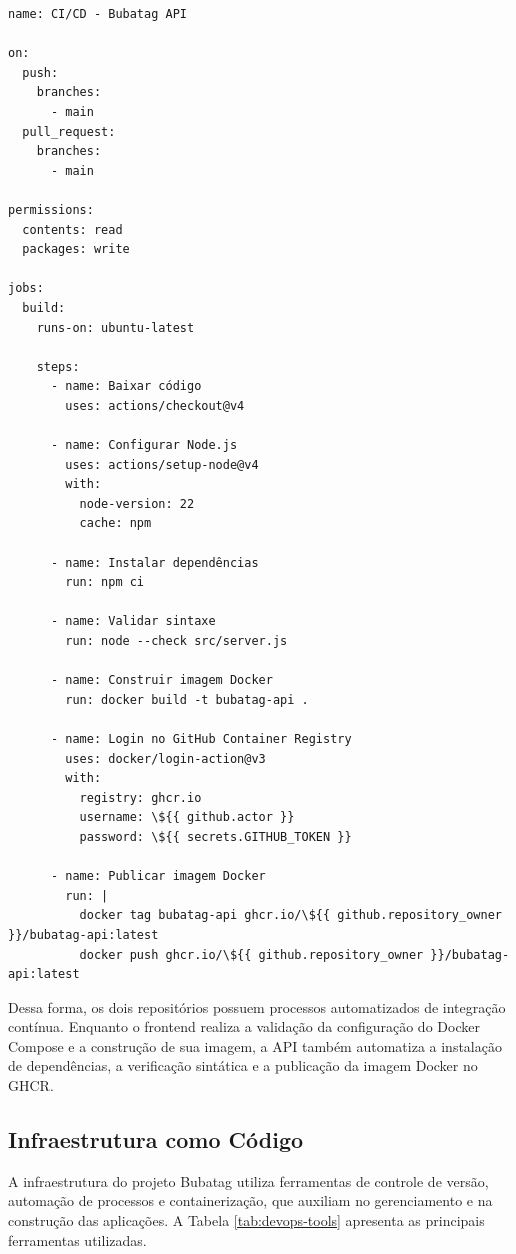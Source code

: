 \documentclass[11pt,a4paper]{article}
\begin{document}
\begin{verbatim}
name: CI/CD - Bubatag API

on:
  push:
    branches:
      - main
  pull_request:
    branches:
      - main

permissions:
  contents: read
  packages: write

jobs:
  build:
    runs-on: ubuntu-latest

    steps:
      - name: Baixar código
        uses: actions/checkout@v4

      - name: Configurar Node.js
        uses: actions/setup-node@v4
        with:
          node-version: 22
          cache: npm

      - name: Instalar dependências
        run: npm ci

      - name: Validar sintaxe
        run: node --check src/server.js

      - name: Construir imagem Docker
        run: docker build -t bubatag-api .

      - name: Login no GitHub Container Registry
        uses: docker/login-action@v3
        with:
          registry: ghcr.io
          username: \${{ github.actor }}
          password: \${{ secrets.GITHUB_TOKEN }}

      - name: Publicar imagem Docker
        run: |
          docker tag bubatag-api ghcr.io/\${{ github.repository_owner }}/bubatag-api:latest
          docker push ghcr.io/\${{ github.repository_owner }}/bubatag-api:latest
\end{verbatim}

Dessa forma, os dois repositórios possuem processos automatizados de integração contínua. Enquanto o frontend realiza a validação da configuração do Docker Compose e a construção de sua imagem, a API também automatiza a instalação de dependências, a verificação sintática e a publicação da imagem Docker no GHCR.

\subsection{Infraestrutura como Código}

A infraestrutura do projeto Bubatag utiliza ferramentas de controle de versão, automação de processos e containerização, que auxiliam no gerenciamento e na construção das aplicações. A Tabela \ref{tab:devops-tools} apresenta as principais ferramentas utilizadas.
\end{document}
